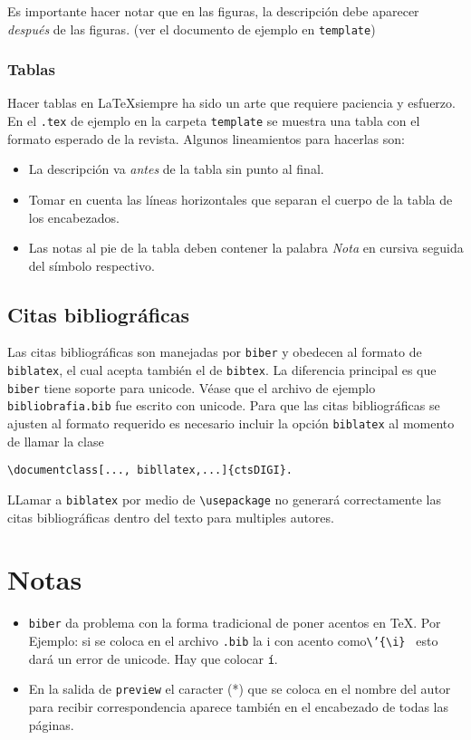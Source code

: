 \documentclass{article}
\begin{document}
Es importante hacer notar que en las figuras, la descripción debe aparecer \emph{después} de las figuras. (ver el documento de ejemplo en \texttt{template})

\subsubsection{Tablas}
Hacer tablas en \LaTeX siempre ha sido un arte que requiere paciencia y esfuerzo. En el \texttt{.tex} de ejemplo en la carpeta \texttt{template} se muestra una tabla con el formato esperado de la revista. Algunos lineamientos para hacerlas son:
\begin{itemize}
\item La descripción va \emph{antes} de la tabla sin punto al final.
\item Tomar en cuenta las líneas horizontales que separan el cuerpo de la tabla de los encabezados.
\item Las notas al pie de la tabla deben contener la palabra \emph{Nota} en cursiva seguida del símbolo respectivo.
\end{itemize}



\subsection{Citas bibliográficas}
Las citas bibliográficas son manejadas por \texttt{biber} y obedecen al formato de \texttt{biblatex}, el cual acepta también el de \texttt{bibtex}. La diferencia principal es que \texttt{biber} tiene soporte para unicode. Véase que el archivo de ejemplo \texttt{bibliobrafia.bib} fue escrito con unicode. Para que las citas bibliográficas se ajusten al formato requerido es necesario incluir la opción \texttt{biblatex} al momento de llamar la clase
\begin{verbatim}
\documentclass[..., bibllatex,...]{ctsDIGI}.
\end{verbatim}
LLamar a \texttt{biblatex} por medio de \texttt{\textbackslash usepackage} no generará correctamente las citas bibliográficas dentro del texto para multiples autores.


\section{Notas}
\begin{itemize}

\item \texttt{biber} da problema con la forma tradicional de poner acentos en \TeX. Por Ejemplo: si se coloca en el archivo \texttt{.bib} la i con acento como\texttt{\textbackslash'\{\textbackslash i\} } esto dará un error de unicode. Hay que colocar \texttt{í}.

\item En la salida de \texttt{preview} el caracter (*) que se coloca en el nombre del autor para recibir correspondencia aparece también en el encabezado de todas las páginas.

\end{itemize}
\end{document}
